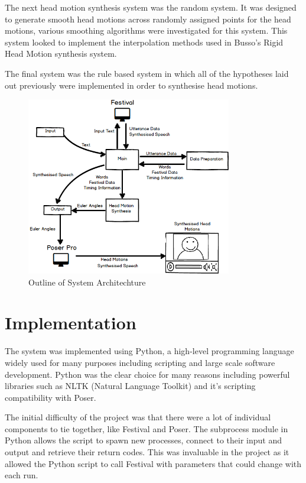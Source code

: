 \documentclass[bsc,frontabs,twoside,singlespacing,parskip]{infthesis}
\begin{document}
The next head motion synthesis system was the random system. It was designed to generate smooth head motions across randomly assigned points for the head motions, various smoothing algorithms were investigated for this system. This system looked to implement the interpolation methods used in Busso's Rigid Head Motion synthesis system. \cite{busso_rigid}

The final system was the rule based system in which all of the hypotheses laid out previously were implemented in order to synthesise head motions. 

\begin{figure}
	\centering
	\includegraphics[width=0.8\textwidth]{system.png}
	\caption{Outline of System Architechture}
\end{figure}

\chapter{Implementation}

The system was implemented using Python, a high-level programming language widely used for many purposes including scripting and large scale software development. Python was the clear choice for many reasons including powerful libraries such as NLTK (Natural Language Toolkit) \cite{nltk} and it's scripting compatibility with Poser. 

The initial difficulty of the project was that there were a lot of individual components to tie together, like Festival and Poser. The subprocess module in Python allows the script to spawn new processes, connect to their input and output and retrieve their return codes. This was invaluable in the project as it allowed the Python script to call Festival with parameters that could change with each run.
\end{document}
